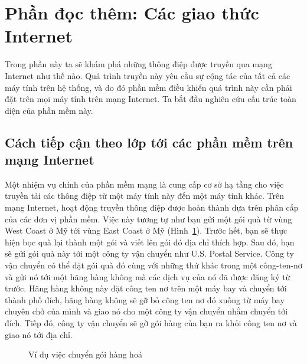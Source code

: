 
\section{Phần đọc thêm: Các giao thức Internet}
\label{sec:4.4}
Trong phần này ta sẽ khám phá những thông điệp được truyền qua mạng Internet như thế
nào. Quá trình truyền này yêu cầu sự cộng tác của tất cả các máy tính trên hệ thống, và do
đó phần mềm điều khiển quá trình này cần phải đặt trên mọi máy tính trên mạng
Internet. Ta bắt đầu nghiên cứu cấu trúc toàn diện của phần mềm này.

\subsection*{Cách tiếp cận theo lớp tới các phần mềm trên mạng Internet}

Một nhiệm vụ chính của phần mềm mạng là cung cấp cơ sở hạ tầng cho việc truyền tải các
thông điệp từ một máy tính này đến một máy tính khác. Trên mạng Internet, hoạt động truyền
thông điệp được hoàn thành dựa trên phân cấp của các đơn vị phần mềm. Việc này tương tự
như bạn gửi một gói quà từ vùng West Coast ở Mỹ tới vùng East Coast ở Mỹ
(Hình~\ref{fig:fig4.12}). Trước hết, bạn sẽ thực hiện bọc quà lại thành một gói và viết
lên gói đó địa chỉ thích hợp. Sau đó, bạn sẽ gửi gói quà này tới một công ty vận chuyển
như U.S. Postal Service. Công ty vận chuyển có thể đặt gói quà đó cùng với những thứ khác
trong một công-ten-nơ và gửi nó tới một hãng hàng không mà các dịch vụ của nó đã được đăng
ký từ trước. Hãng hàng không này đặt công ten nơ trên một máy bay và chuyển tới thành phố
đích, hãng hàng không sẽ gỡ bỏ công ten nơ đó xuống từ máy bay chuyên chở của mình và giao
nó cho một công ty vận chuyển nhằm chuyển tới đích. Tiếp đó, công ty vận chuyển sẽ gỡ gói
hàng của bạn ra khỏi công ten nơ và giao nó tới địa chỉ.

\begin{figure} [tbh]
  \centering {}
  \caption{Ví dụ việc chuyển gói hàng hoá}
  \label{fig:fig4.12}
\end{figure}

